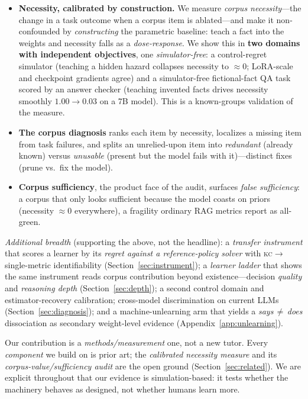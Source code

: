\documentclass{article}
\newcommand{\kc}{\textsc{kc}}
\begin{document}
\begin{itemize}
  \item \textbf{Necessity, calibrated by construction.} We measure \emph{corpus necessity}---the
  change in a task outcome when a corpus item is ablated---and make it non-confounded by
  \emph{constructing} the parametric baseline: teach a fact into the weights and necessity falls
  as a \emph{dose-response}. We show this in \textbf{two domains with independent objectives},
  one \emph{simulator-free}: a control-regret simulator (teaching a hidden hazard collapses
  necessity to $\approx 0$; LoRA-scale and checkpoint gradients agree) and a simulator-free
  fictional-fact QA task scored by an answer checker (teaching invented facts drives necessity
  smoothly $1.00\!\to\!0.03$ on a 7B model). This is a known-groups validation of the measure.
  \item \textbf{The corpus diagnosis} ranks each item by necessity, localizes a missing item from
  task failures, and splits an unrelied-upon item into \emph{redundant} (already known) versus
  \emph{unusable} (present but the model fails with it)---distinct fixes (prune vs.\ fix the model).
  \item \textbf{Corpus sufficiency}, the product face of the audit, surfaces \emph{false
  sufficiency}: a corpus that only looks sufficient because the model coasts on priors (necessity
  $\approx 0$ everywhere), a fragility ordinary RAG metrics report as all-green.
\end{itemize}

\emph{Additional breadth} (supporting the above, not the headline): a \emph{transfer instrument}
that scores a learner by its \emph{regret against a reference-policy solver} with
\kc$\to$single-metric identifiability (Section~\ref{sec:instrument}); a \emph{learner ladder} that
shows the same instrument reads corpus contribution beyond existence---decision \emph{quality} and
\emph{reasoning depth} (Section~\ref{sec:depth}); a second control domain and
estimator-recovery calibration; cross-model discrimination on current LLMs
(Section~\ref{sec:diagnosis}); and a machine-unlearning arm that yields a \emph{says\,$\neq$\,does}
dissociation as secondary weight-level evidence (Appendix~\ref{app:unlearning}).

Our contribution is a \emph{methods/measurement} one, not a new tutor. Every \emph{component} we
build on is prior art; the \emph{calibrated necessity measure} and its \emph{corpus-value/sufficiency
audit} are the open ground (Section~\ref{sec:related}). We are explicit throughout that our
evidence is simulation-based: it tests whether the machinery behaves as designed, not whether
humans learn more.
\end{document}
